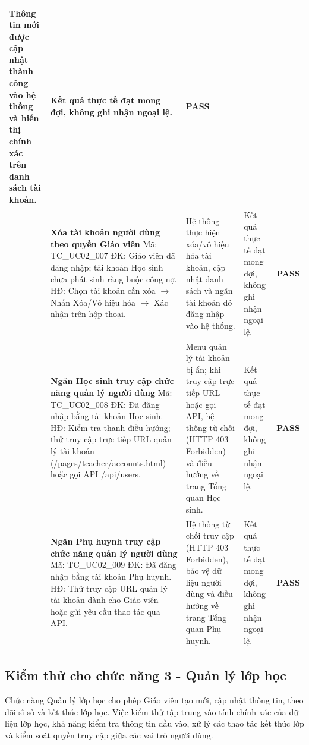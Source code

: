 \begin{longtable}{|>{\centering\arraybackslash}p{0.8cm}|>{\raggedright\arraybackslash}p{4.6cm}|>{\raggedright\arraybackslash}p{3.8cm}|>{\raggedright\arraybackslash}p{3.8cm}|>{\centering\arraybackslash}p{1.5cm}|}
Thông tin mới được cập nhật thành công vào hệ thống và hiển thị chính xác trên danh sách tài khoản. &
Kết quả thực tế đạt mong đợi, không ghi nhận ngoại lệ. & \textbf{PASS} \\
\hline
7 & \textbf{Xóa tài khoản người dùng theo quyền Giáo viên}\newline
Mã: TC\_UC02\_007\newline
ĐK: Giáo viên đã đăng nhập; tài khoản Học sinh chưa phát sinh ràng buộc công nợ.\newline
HĐ: Chọn tài khoản cần xóa $\rightarrow$ Nhấn Xóa/Vô hiệu hóa $\rightarrow$ Xác nhận trên hộp thoại. &
Hệ thống thực hiện xóa/vô hiệu hóa tài khoản, cập nhật danh sách và ngăn tài khoản đó đăng nhập vào hệ thống. &
Kết quả thực tế đạt mong đợi, không ghi nhận ngoại lệ. & \textbf{PASS} \\
\hline
8 & \textbf{Ngăn Học sinh truy cập chức năng quản lý người dùng}\newline
Mã: TC\_UC02\_008\newline
ĐK: Đã đăng nhập bằng tài khoản Học sinh.\newline
HĐ: Kiểm tra thanh điều hướng; thử truy cập trực tiếp URL quản lý tài khoản (/pages/teacher/accounts.html) hoặc gọi API /api/users. &
Menu quản lý tài khoản bị ẩn; khi truy cập trực tiếp URL hoặc gọi API, hệ thống từ chối (HTTP 403 Forbidden) và điều hướng về trang Tổng quan Học sinh. &
Kết quả thực tế đạt mong đợi, không ghi nhận ngoại lệ. & \textbf{PASS} \\
\hline
9 & \textbf{Ngăn Phụ huynh truy cập chức năng quản lý người dùng}\newline
Mã: TC\_UC02\_009\newline
ĐK: Đã đăng nhập bằng tài khoản Phụ huynh.\newline
HĐ: Thử truy cập URL quản lý tài khoản dành cho Giáo viên hoặc gửi yêu cầu thao tác qua API. &
Hệ thống từ chối truy cập (HTTP 403 Forbidden), bảo vệ dữ liệu người dùng và điều hướng về trang Tổng quan Phụ huynh. &
Kết quả thực tế đạt mong đợi, không ghi nhận ngoại lệ. & \textbf{PASS} \\
\hline
\end{longtable}

\vspace{0.8em}
\subsection{Kiểm thử cho chức năng 3 - Quản lý lớp học}

\hspace*{1em}Chức năng Quản lý lớp học cho phép Giáo viên tạo mới, cập nhật thông tin, theo dõi sĩ số và kết thúc lớp học. Việc kiểm thử tập trung vào tính chính xác của dữ liệu lớp học, khả năng kiểm tra thông tin đầu vào, xử lý các thao tác kết thúc lớp và kiểm soát quyền truy cập giữa các vai trò người dùng.

